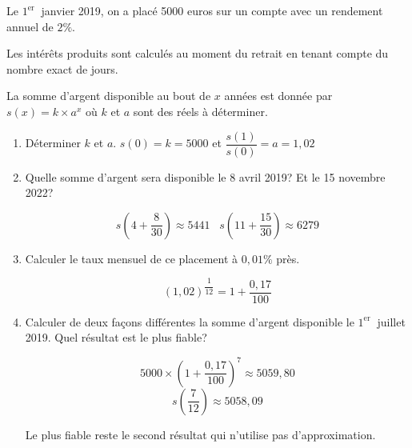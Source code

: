 \documentclass[french]{book}
\begin{document}
\begin{corrige}
Le $1^{\text {er }}$ janvier 2019, on a placé 5000 euros sur un compte avec un rendement annuel de $2 \%$.

Les intérêts produits sont calculés au moment du retrait en tenant compte du nombre exact de jours.

La somme d'argent disponible au bout de $x$ années est donnée par $s(x)=k \times a^{x}$ où $k$ et $a$ sont des réels à déterminer.

\begin{enumerate}
\item Déterminer $k$ et $a$.
$s(0)=k=5000$ et $\dfrac{s(1)}{s(0)}=a=1,02$

\item Quelle somme d'argent sera disponible le 8 avril 2019? Et le 15 novembre 2022?

$$s(4+\dfrac{8}{30})\approx 5441 \;\;\; s(11+\dfrac{15}{30})\approx 6279$$

\item Calculer le taux mensuel de ce placement à $0,01 \%$ près.

$$(1,02)^\dfrac{1}{12}=1+\dfrac{0,17}{100}$$

\item Calculer de deux façons différentes la somme d'argent disponible le $1^{\text {er }}$ juillet 2019. Quel résultat est le plus fiable?

$$5000 \times (1+ \dfrac{0,17}{100})^7 \approx 5059,80$$
$$s(\dfrac{7}{12})\approx 5058,09$$

Le plus fiable reste le second résultat qui n'utilise pas d'approximation.

\end{enumerate}
\end{corrige}
\end{document}
